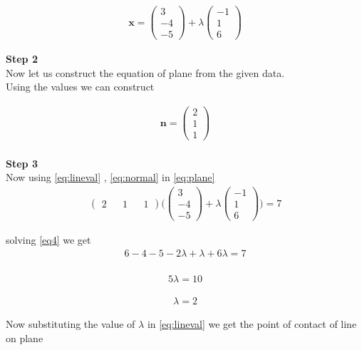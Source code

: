 \documentclass[10pt,a4paper,twocolumn]{article}
\newcommand{\myvec}[1]{\ensuremath{\begin{pmatrix}#1\end{pmatrix}}}
\numberwithin{equation}{section}
\begin{document}
\begin{align}
\textbf{x}=\myvec{3 \\-4 \\-5}+\lambda 
\myvec{-1 \\1 \\6}\label{eq:lineval}
\end{align}

\textbf{Step 2}\\
Now let us construct the equation of plane from the given data.\\
Using the values we can construct 

\begin{align}
\textbf{n}=\myvec{ 2\\ 1\\1}\label{eq:normal}
\end{align}\\

\textbf{Step 3}\\
Now using \ref{eq:lineval} , \ref{eq:normal}   in \ref{eq:plane}\\

\begin{align}
\myvec{ 2 && 1 && 1} \Bigg( \myvec{3 \\-4 \\-5}+\lambda\myvec{-1 \\1 \\6} \Bigg)=7\label{eq4}
\end{align}

solving \ref{eq4} we get \\
\begin{align}  
6 -4 -5-2\lambda+ \lambda+ 6 \lambda=7 
\end{align}
\\ 
\begin{align} 
5 \lambda=10 
\end{align}

\begin{align}
\lambda=2 \label{eq5} 
\end{align}

Now substituting the value of $\lambda$ in \ref{eq:lineval} we get the point of contact of line on plane
\end{document}

